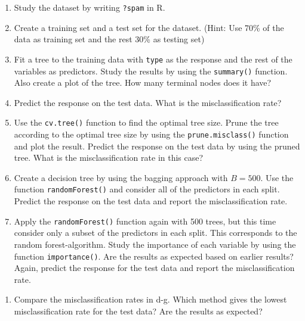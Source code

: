 \documentclass[
]{article}
\providecommand{\tightlist}{%
  \setlength{\itemsep}{0pt}\setlength{\parskip}{0pt}}
\begin{document}
\begin{enumerate}
\def\labelenumi{\alph{enumi})}
\item
  Study the dataset by writing \texttt{?spam} in R.
\item
  Create a training set and a test set for the dataset. (Hint: Use 70\%
  of the data as training set and the rest 30\% as testing set)
\item
  Fit a tree to the training data with \texttt{type} as the response and
  the rest of the variables as predictors. Study the results by using
  the \texttt{summary()} function. Also create a plot of the tree. How
  many terminal nodes does it have?
\item
  Predict the response on the test data. What is the misclassification
  rate?
\item
  Use the \texttt{cv.tree()} function to find the optimal tree size.
  Prune the tree according to the optimal tree size by using the
  \texttt{prune.misclass()} function and plot the result. Predict the
  response on the test data by using the pruned tree. What is the
  misclassification rate in this case?
\item
  Create a decision tree by using the bagging approach with \(B=500\).
  Use the function \texttt{randomForest()} and consider all of the
  predictors in each split. Predict the response on the test data and
  report the misclassification rate.
\item
  Apply the \texttt{randomForest()} function again with 500 trees, but
  this time consider only a subset of the predictors in each split. This
  corresponds to the random forest-algorithm. Study the importance of
  each variable by using the function \texttt{importance()}. Are the
  results as expected based on earlier results? Again, predict the
  response for the test data and report the misclassification rate.
\end{enumerate}

\begin{enumerate}
\def\labelenumi{\alph{enumi})}
\setcounter{enumi}{7}
\tightlist
\item
  Compare the misclassification rates in d-g. Which method gives the
  lowest misclassification rate for the test data? Are the results as
  expected?
\end{enumerate}
\end{document}
